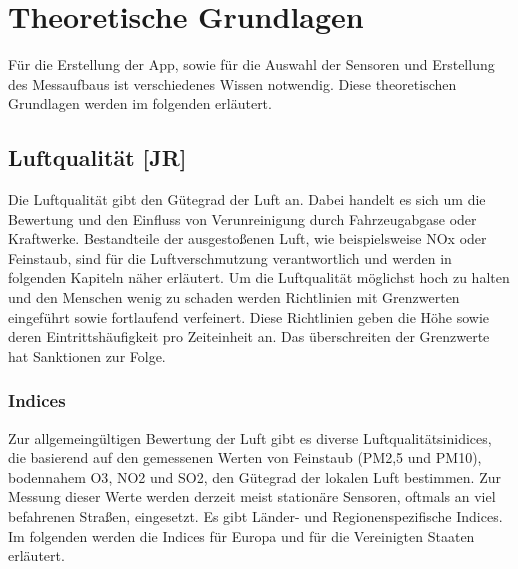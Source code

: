 
\chapter{Theoretische Grundlagen}\label{cha:Grundlagen}
Für die Erstellung der App, sowie für die Auswahl der Sensoren und Erstellung des Messaufbaus ist verschiedenes Wissen notwendig. Diese theoretischen Grundlagen werden im folgenden erläutert. 

\section{Luftqualität [JR]}\label{sec:Luftqualität}
Die Luftqualität gibt den Gütegrad der Luft an.  Dabei handelt es sich um die Bewertung und den Einfluss von Verunreinigung durch Fahrzeugabgase oder Kraftwerke. Bestandteile der ausgestoßenen Luft, wie beispielsweise \acf{NOx} oder Feinstaub, sind für die Luftverschmutzung verantwortlich und werden in folgenden Kapiteln näher erläutert.
Um die Luftqualität möglichst hoch zu halten und den Menschen wenig zu schaden werden Richtlinien mit Grenzwerten eingeführt sowie fortlaufend verfeinert. Diese Richtlinien geben die Höhe sowie deren Eintrittshäufigkeit pro Zeiteinheit an. Das überschreiten der Grenzwerte hat Sanktionen zur Folge. \cite{UBA.Luft}
\subsection{Indices}
Zur allgemeingültigen Bewertung der Luft gibt es diverse Luftqualitätsinidices, die basierend auf den gemessenen Werten von Feinstaub (PM2,5 und PM10), bodennahem \acf{O3}, \ac{NO2} und \acf{SO2}, den Gütegrad der lokalen Luft bestimmen. Zur Messung dieser Werte werden derzeit meist stationäre Sensoren, oftmals an viel befahrenen Straßen, eingesetzt. 
\newline
Es gibt Länder- und Regionenspezifische Indices. Im folgenden werden die Indices für Europa und für die Vereinigten Staaten erläutert.

